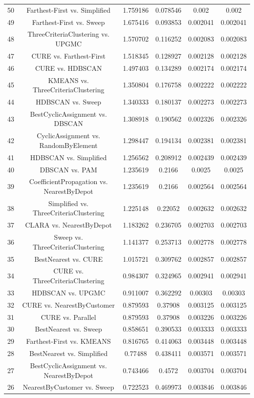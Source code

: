 \documentclass[a4paper,10pt]{article}
\begin{document}
\begin{landscape}
\begin{table}[!htp]
\begin{tabular}{cccccc}
50&Farthest-First vs. Simplified&1.759186&0.078546&0.002&0.002\\
49&Farthest-First vs. Sweep&1.675416&0.093853&0.002041&0.002041\\
48&ThreeCriteriaClustering vs. UPGMC&1.570702&0.116252&0.002083&0.002083\\
47&CURE vs. Farthest-First&1.518345&0.128927&0.002128&0.002128\\
46&CURE vs. HDBSCAN&1.497403&0.134289&0.002174&0.002174\\
45&KMEANS vs. ThreeCriteriaClustering&1.350804&0.176758&0.002222&0.002222\\
44&HDBSCAN vs. Sweep&1.340333&0.180137&0.002273&0.002273\\
43&BestCyclicAssignment vs. DBSCAN&1.308918&0.190562&0.002326&0.002326\\
42&CyclicAssignment vs. RandomByElement&1.298447&0.194134&0.002381&0.002381\\
41&HDBSCAN vs. Simplified&1.256562&0.208912&0.002439&0.002439\\
40&DBSCAN vs. PAM&1.235619&0.2166&0.0025&0.0025\\
39&CoefficientPropagation vs. NearestByDepot&1.235619&0.2166&0.002564&0.002564\\
38&Simplified vs. ThreeCriteriaClustering&1.225148&0.22052&0.002632&0.002632\\
37&CLARA vs. NearestByDepot&1.183262&0.236705&0.002703&0.002703\\
36&Sweep vs. ThreeCriteriaClustering&1.141377&0.253713&0.002778&0.002778\\
35&BestNearest vs. CURE&1.015721&0.309762&0.002857&0.002857\\
34&CURE vs. ThreeCriteriaClustering&0.984307&0.324965&0.002941&0.002941\\
33&HDBSCAN vs. UPGMC&0.911007&0.362292&0.00303&0.00303\\
32&CURE vs. NearestByCustomer&0.879593&0.37908&0.003125&0.003125\\
31&CURE vs. Parallel&0.879593&0.37908&0.003226&0.003226\\
30&BestNearest vs. Sweep&0.858651&0.390533&0.003333&0.003333\\
29&Farthest-First vs. KMEANS&0.816765&0.414063&0.003448&0.003448\\
28&BestNearest vs. Simplified&0.77488&0.438411&0.003571&0.003571\\
27&BestCyclicAssignment vs. NearestByDepot&0.743466&0.4572&0.003704&0.003704\\
26&NearestByCustomer vs. Sweep&0.722523&0.469973&0.003846&0.003846\\

\end{tabular}
\end{table}
\end{landscape}
\end{document}
